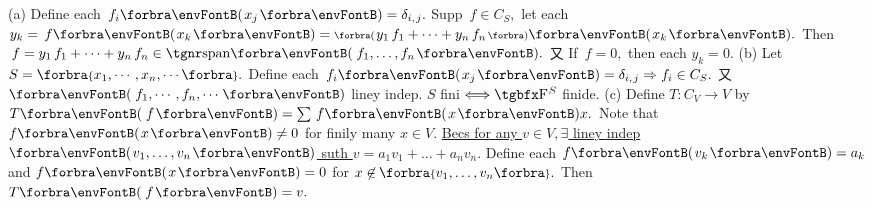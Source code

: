 (a) Define each $\,f_i\Par{x_j}=\delta_{i,\;\!j}.$ Supp $\,f\in C_S,$ let each $y_k=\,f\Par{x_k}=\BigPar{y_1\,f_1+\dots+y_n\,f_n}\Par{x_k}.$\parSol{\Ha}
Then $\,f=y_1\,f_1+\dots+y_n\,f_n\in\Span{\,f_1,\dots,f_n}.$ 又 If $\,f=0,$ then each $y_k=0.$\vspace{3pt}\parSol{}
(b) Let $S=\Bra{x_1,\cdots,x_n,\cdots}.$ Define each $\,f_i\Par{x_j}=\delta_{i,\;\!j}\Rightarrow f_i\in C_S.$ 又 $\Par{\,f_1,\cdots,f_n,\cdots}$ liney indep.\parSol{\Hb}
\ACoro $S$ fini $\Longleftrightarrow\FbbP{S}$ finide.\vspace{3pt}\parSol{}
(c) Define $T:C_V\rightarrow V$ by $T\Par{\,f}=\sum\,f\Par{x}x.$ Note that $f\Par{x}\neq0$ for finily many $x\in V.$\parSol{\Hc}
\uline{Becs for any $v\in V,\exists$ liney indep $\Par{v_1,\dots,v_n}$ suth $v=a_1v_1+\dots+a_nv_n.$} \parSol{\Hc}
Define each $\:\!f\Par{v_k}=a_k$ and $f\Par{x}=0$ for $x\not\in\;\!\!\Bra{v_1,\dots,v_n}.$ Then $T\Par{\,f}=v.$\PfEnd
\SepLine


